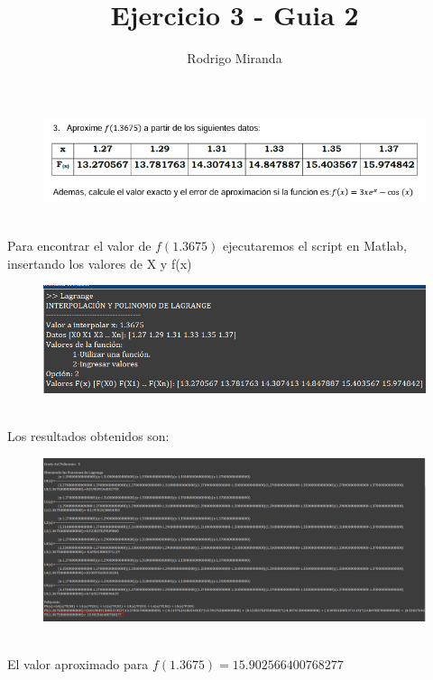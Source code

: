 \documentclass{article}
\title{Ejercicio 3 - Guia 2}
\author{Rodrigo Miranda}
\theoremstyle{mytheoremstyle}
\theoremstyle{mytheoremstyle}
\theoremstyle{myproblemstyle}
\begin{document}
    
\begin{figure}[ht]
    \includegraphics[scale=0.8]{img/eje3_1.png}
\end{figure}

\noindent \\ Para encontrar el valor de $f(1.3675)$ ejecutaremos el script en Matlab, insertando los valores de X y f(x)
\begin{figure}[ht]
    \includegraphics[scale=0.7]{img/eje3_2.png}
\end{figure}
\noindent \\ Los resultados obtenidos son:
\begin{figure}[ht]
    \includegraphics[scale=0.6]{img/eje3_3.png}
\end{figure}
\noindent \\ El valor aproximado para $f(1.3675)=15.902566400768277$
\end{document}
